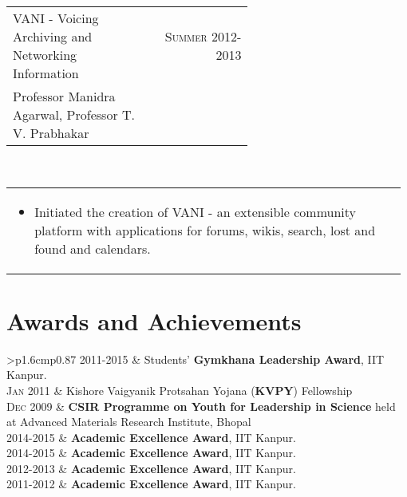 \documentclass[a4paper]{article} %
\newcommand{\verticalspacing}{-0.25cm}
\newcommand{\bulletspace}{0.7cm}
\newcommand{\projectheadspacing}{6.9cm}
\newcommand{\cproject}[5]{%
    \begin{tabular}{p{0.60\linewidth}r}
        \textcolor{NavyBlue}{\small #2} & \multicolumn{1}{m{ \projectheadspacing{} }}{\raggedleft \small {\textsc{#1}}}\\
        \small {#3} & \small {#4}
    \end{tabular}\\
    \begin{tabular}{p{0.98\linewidth}}
    \vspace{-0.3cm}
        \small{#5}
    \end{tabular}
    \vspace{\verticalspacing{}}
}
\newcommand{\itemlist}[1]{%
    \def\arraystretch{1.2}
    \begin{tabular}{>{\raggedleft}p{1.6cm}p{0.87\linewidth}}
        #1
    \end{tabular}
    \def\arraystretch{1.0}
}
\begin{document}
\cproject
    {Summer 2012-2013}
    {VANI - Voicing Archiving and Networking Information}
    {Professor Manidra Agarwal, Professor T. V. Prabhakar}
    {}
    {%
        \begin{itemize}[leftmargin=\bulletspace{}]
            \item Initiated the creation of VANI - an extensible community platform with applications
                for forums, wikis, search, lost and found and calendars.
        \end{itemize}
    }

\section{Awards and Achievements}

\itemlist {%
    \textsc{\small 2011-2015}   & Students' \textbf{Gymkhana Leadership Award}, IIT Kanpur. \\
    \textsc{\small Jan 2011}    & Kishore Vaigyanik Protsahan Yojana (\textbf{KVPY}) Fellowship \\
    \textsc{\small Dec 2009}    & \textbf{CSIR Programme on Youth for Leadership in Science} held at
                                  Advanced Materials Research Institute, Bhopal\\

    \textsc{\small 2014-2015}   & \textbf{Academic Excellence Award}, IIT Kanpur. \\
    \textsc{\small 2014-2015}   & \textbf{Academic Excellence Award}, IIT Kanpur. \\
    \textsc{\small 2012-2013}   & \textbf{Academic Excellence Award}, IIT Kanpur. \\
    \textsc{\small 2011-2012}   & \textbf{Academic Excellence Award}, IIT Kanpur. \\
}

\end{document}
